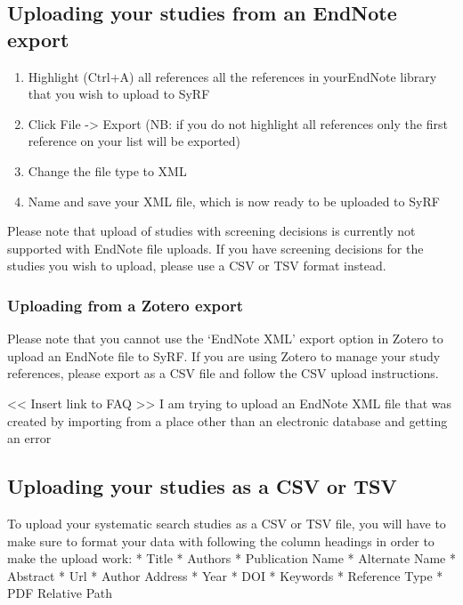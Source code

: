 \documentclass[
]{book}
\providecommand{\tightlist}{%
  \setlength{\itemsep}{0pt}\setlength{\parskip}{0pt}}
\begin{document}
\hypertarget{uploading-your-studies-from-an-endnote-export}{%
\subsection{Uploading your studies from an EndNote export}\label{uploading-your-studies-from-an-endnote-export}}

\begin{enumerate}
\def\labelenumi{\arabic{enumi}.}
\tightlist
\item
  Highlight (Ctrl+A) all references all the references in yourEndNote library that you wish to upload to SyRF
\item
  Click File -\textgreater{} Export (NB: if you do not highlight all references only the first reference on your list will be exported)
\item
  Change the file type to XML
\item
  Name and save your XML file, which is now ready to be uploaded to SyRF
\end{enumerate}

Please note that upload of studies with screening decisions is currently not supported with EndNote file uploads. If you have screening decisions for the studies you wish to upload, please use a CSV or TSV format instead.

\hypertarget{uploading-from-a-zotero-export}{%
\subsubsection{Uploading from a Zotero export}\label{uploading-from-a-zotero-export}}

Please note that you cannot use the `EndNote XML' export option in Zotero to upload an EndNote file to SyRF. If you are using Zotero to manage your study references, please export as a CSV file and follow the CSV upload instructions.

\textless{}\textless{} Insert link to FAQ \textgreater{}\textgreater{}
I am trying to upload an EndNote XML file that was created by importing from a place other than an electronic database and getting an error

\hypertarget{uploading-your-studies-as-a-csv-or-tsv}{%
\subsection{Uploading your studies as a CSV or TSV}\label{uploading-your-studies-as-a-csv-or-tsv}}

To upload your systematic search studies as a CSV or TSV file, you will have to make sure to format your data with following the column headings in order to make the upload work:
* Title
* Authors
* Publication Name
* Alternate Name
* Abstract
* Url
* Author Address
* Year
* DOI
* Keywords
* Reference Type
* PDF Relative Path
\end{document}
